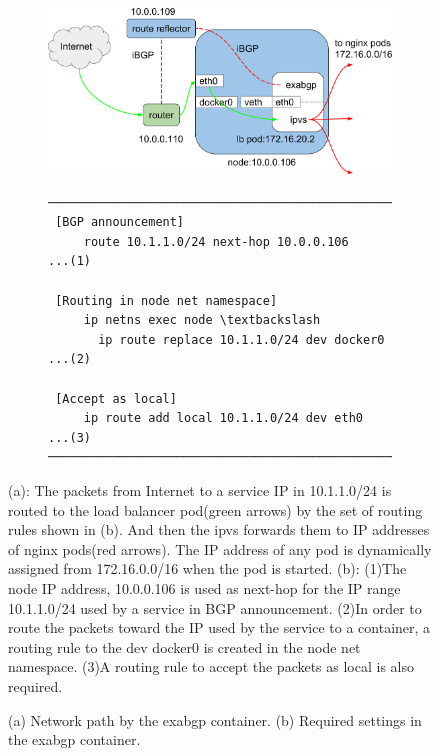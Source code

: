 \begin{figure}[tb]

  \begin{subfigure}[t]{\columnwidth}
    \includegraphics[width=0.9\columnwidth]{Figs/exabgp}
    \caption{}
    \label{fig:exabgp_schem}
  \end{subfigure}

  \par\bigskip

  \begin{subfigure}[t]{\columnwidth}

\begin{Verbatim}[commandchars=\\\{\}]
───────────────────────────────────────────────────────
 [BGP announcement]
     route 10.1.1.0/24 next-hop 10.0.0.106       ...(1)

 [Routing in node net namespace]
     ip netns exec node \textbackslash
       ip route replace 10.1.1.0/24 dev docker0  ...(2)
      
 [Accept as local]
     ip route add local 10.1.1.0/24 dev eth0     ...(3)
───────────────────────────────────────────────────────
\end{Verbatim}
    \caption{}
    \label{fig:exabgp_setting}
  \end{subfigure}

  \caption{
    (a) Network path by the exabgp container.
    (b) Required settings in the exabgp container.
  }
  (a): The packets from Internet to a service IP in 10.1.1.0/24 is routed to the load balancer pod(green arrows) by the set of routing rules shown in (b).
  And then the ipvs forwards them to IP addresses of nginx pods(red arrows).
  The IP address of any pod is dynamically assigned from 172.16.0.0/16 when the pod is started. 
  (b): (1)The node IP address, 10.0.0.106 is used as next-hop for the IP range 10.1.1.0/24 used by a service in BGP announcement.
  (2)In order to route the packets toward the IP used by the service to a container, a routing rule to the dev docker0 is created in the node net namespace.
  (3)A routing rule to accept the packets as local is also required. 
\label{fig:exabgp}
\end{figure}

